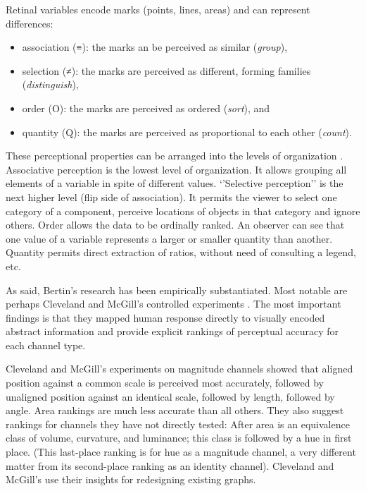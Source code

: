 \documentclass[
]{book}
\providecommand{\tightlist}{%
  \setlength{\itemsep}{0pt}\setlength{\parskip}{0pt}}
\begin{document}
Retinal variables encode marks (points, lines, areas) and can represent differences:

\begin{itemize}
\tightlist
\item
  association (≡): the marks an be perceived as similar (\emph{group}),
\item
  selection (≠): the marks are perceived as different, forming families (\emph{distinguish}),
\item
  order (O): the marks are perceived as ordered (\emph{sort}), and
\item
  quantity (Q): the marks are perceived as proportional to each other (\emph{count}).
\end{itemize}

These perceptional properties can be arranged into the levels of organization \citep{green1998toward}. Associative perception is the lowest level of organization. It allows grouping all elements of a variable in spite of different values. `'Selective perception'' is the next higher level (flip side of association). It permits the viewer to select one category of a component, perceive locations of objects in that category and ignore others. Order allows the data to be ordinally ranked. An observer can see that one value of a variable represents a larger or smaller quantity than another. Quantity permits direct extraction of ratios, without need of consulting a legend, etc.

As said, Bertin's research has been empirically substantiated. Most notable are perhaps Cleveland and McGill's controlled experiments \citep{ClevelandMcGill1984graphicalperception}. The most important findings is that they mapped human response directly to visually encoded abstract information and provide explicit rankings of perceptual accuracy for each channel type.

Cleveland and McGill's experiments on magnitude channels showed that aligned position against a common scale is perceived most accurately, followed by unaligned position against an identical scale, followed by length, followed by angle. Area rankings are much less accurate than all others. They also suggest rankings for channels they have not directly tested: After area is an equivalence class of volume, curvature, and luminance; this class is followed by a hue in first place. (This last-place ranking is for hue as a magnitude channel, a very different matter from its second-place ranking as an identity channel). Cleveland and McGill's use their insights for redesigning existing graphs.
\end{document}
